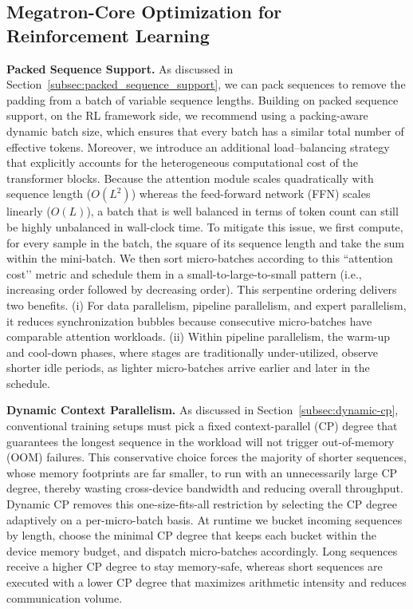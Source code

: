 \documentclass[10pt,logo,copyright]{nvidiatechreport}
\begin{document}
\subsection{Megatron-Core Optimization for Reinforcement Learning}
\textbf{Packed Sequence Support.} As discussed in Section~\ref{subsec:packed_sequence_support}, we can pack sequences to remove the padding from a batch of variable sequence lengths. Building on packed sequence support, on the RL framework side, we recommend using a packing-aware dynamic batch size, which ensures that every batch has a similar total number of effective tokens. Moreover, we introduce an additional load–balancing strategy that explicitly accounts for the heterogeneous computational cost of the transformer blocks. Because the attention module scales quadratically with sequence length (\(O(L^{2})\)) whereas the feed-forward network (FFN) scales linearly (\(O(L)\)), a batch that is well balanced in terms of token count can still be highly unbalanced in wall-clock time. To mitigate this issue, we first compute, for every sample in the batch, the square of its sequence length and take the sum within the mini-batch. We then sort micro-batches according to this ``attention cost’’ metric and schedule them in a small-to-large-to-small pattern (i.e., increasing order followed by decreasing order).
This serpentine ordering delivers two benefits. (i) For data parallelism, pipeline parallelism, and expert parallelism, it reduces synchronization bubbles because consecutive micro-batches have comparable attention workloads. (ii) Within pipeline parallelism, the warm-up and cool-down phases, where stages are traditionally under-utilized, observe shorter idle periods, as lighter micro-batches arrive earlier and later in the schedule.

\textbf{Dynamic Context Parallelism.} As discussed in Section~\ref{subsec:dynamic-cp}, conventional training setups must pick a fixed context-parallel (CP) degree that guarantees the longest sequence in the workload will not trigger out-of-memory (OOM) failures. This conservative choice forces the majority of shorter sequences, whose memory footprints are far smaller, to run with an unnecessarily large CP degree, thereby wasting cross-device bandwidth and reducing overall throughput.
Dynamic CP removes this one-size-fits-all restriction by selecting the CP degree adaptively on a per-micro-batch basis. At runtime we bucket incoming sequences by length, choose the minimal CP degree that keeps each bucket within the device memory budget, and dispatch micro-batches accordingly. Long sequences receive a higher CP degree to stay memory-safe, whereas short sequences are executed with a lower CP degree that maximizes arithmetic intensity and reduces communication volume.
\end{document}
